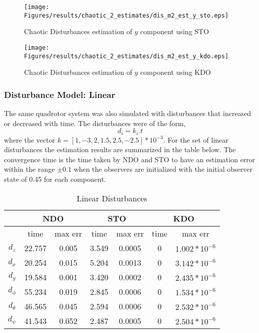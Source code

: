 \documentclass{article}
\begin{document}
\begin{figure}[H]
\centering
\texttt{[image: Figures/results/chaotic\_2\_estimates/dis\_m2\_est\_y\_sto.eps]}
\caption{Chaotic Disturbances estimation of $y$ component using STO}
\label{dis_m2_est_y_sto}
\end{figure}

\begin{figure}[H]
\centering
\texttt{[image: Figures/results/chaotic\_2\_estimates/dis\_m2\_est\_y\_kdo.eps]}
\caption{Chaotic Disturbances estimation of $y$ component using KDO}
\label{dis_m2_est_y_kdo}
\end{figure}

\subsubsection{Disturbance Model: Linear}
The same quadrotor system was also simulated with disturbances that increased or decreased with time. The disturbances were of the form, 
\begin{equation}
d_i = k_i.t
\label{eq:dist_3}
\end{equation}
where the vector $k=[1,-3,2,1.5,2.5,-2.5]*10^{-3}$. 
For the set of linear disturbances the estimation results are summarized in the table below. The convergence time is the time taken by NDO and STO to have an estimation error within the range $\pm0.1$ when the observers are initialized with the initial observer state of 0.45 for each component. 
\begin{table}[!htbp]
\centering
\caption{Linear Disturbances}
\begin{tabular}{*7c}
\toprule
{} &  \multicolumn{2}{c}{NDO} & \multicolumn{2}{c}{STO} & \multicolumn{2}{c}{KDO}\\
\midrule
{}        &   time   & max err  & time  & max err& time  & max err\\
$d_z$     &  22.757 & 0.005   & 3.549  & 0.0005 & 0     & $1.002*10^{-6}$\\
$d_x$     &  20.254 & 0.015   & 5.204  & 0.0013 & 0     & $3.142*10^{-6}$\\
$d_y$     &  19.584 & 0.001   & 3.420  & 0.0002 & 0     & $2.435*10^{-6}$\\
$d_\phi$  &  55.234 & 0.019   & 2.845  & 0.0006 & 0     & $1.534*10^{-6}$\\
$d_\theta$&  46.565 & 0.045   & 2.594  & 0.0006 & 0     & $2.532*10^{-6}$\\
$d_\psi$  &  41.543 & 0.052   & 2.487  & 0.0005 & 0     & $2.504*10^{-6}$\\
\bottomrule
\end{tabular}
\end{table}
\end{document}
